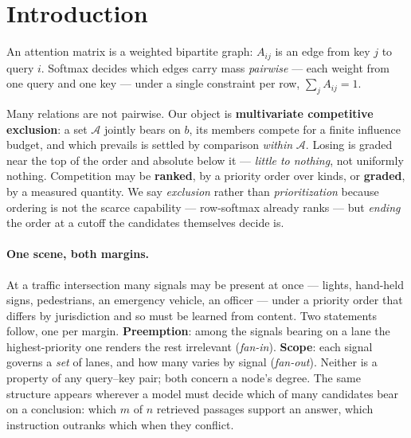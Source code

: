 \documentclass{article}
\begin{document}
\begin{abstract}
is exactly a \emph{precision--recall} interval with \emph{sharp} endpoints, one per error type,
and it is non-empty on every column with a positive margin --- so exact recovery is never
obstructed, and what a hard column costs is the \emph{width} of the target the head must hit.
This yields a falsifiable prediction for multi-hop evidence selection: with $m$ gold facts among
$n$ candidates, \emph{any} full-support attention has evidence precision exactly $m/n$ --- an
identity, not a tendency --- so it degrades as candidates are added and no training arrests it,
while MarSea's support size does not involve $n$. Our load-bearing experiment sweeps $m$ at fixed
task difficulty, separating the expressivity claim from the effect of exclusion-shaped training,
and we pre-commit to reporting either outcome. This concerns degradation with \emph{candidate
count} and not the positional U-shape, whose architectural origin is separately understood.
\end{abstract}

\section{Introduction}
\label{sec:intro}

An attention matrix is a weighted bipartite graph: $A_{ij}$ is an edge from key $j$ to query $i$.
Softmax decides which edges carry mass \emph{pairwise} --- each weight from one query and one key
--- under a single constraint per row, $\sum_j A_{ij}=1$.

Many relations are not pairwise. Our object is \textbf{multivariate competitive exclusion}: a set
$\mathcal{A}$ jointly bears on $b$, its members compete for a finite influence budget, and which
prevails is settled by comparison \emph{within} $\mathcal{A}$. Losing is graded near the top of
the order and absolute below it --- \emph{little to nothing}, not uniformly nothing. Competition
may be \textbf{ranked}, by a priority order over kinds, or \textbf{graded}, by a measured
quantity. We say \emph{exclusion} rather than \emph{prioritization} because ordering is not the
scarce capability --- row-softmax already ranks --- but \emph{ending} the order at a cutoff the
candidates themselves decide is.

\paragraph{One scene, both margins.} At a traffic intersection many signals may be present at
once --- lights, hand-held signs, pedestrians, an emergency vehicle, an officer --- under a
priority order that differs by jurisdiction and so must be learned from content. Two statements
follow, one per margin. \textbf{Preemption}: among the signals bearing on a lane the
highest-priority one renders the rest irrelevant (\emph{fan-in}). \textbf{Scope}: each signal
governs a \emph{set} of lanes, and how many varies by signal (\emph{fan-out}). Neither is a
property of any query--key pair; both concern a node's degree. The same structure appears
wherever a model must decide which of many candidates bear on a conclusion: which $m$ of $n$
retrieved passages support an answer, which instruction outranks which when they conflict.
\end{document}
